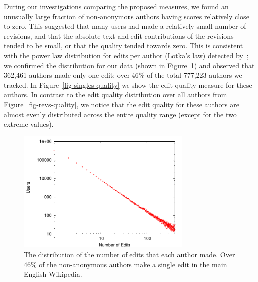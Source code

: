 During our investigations comparing the proposed measures,
we found an unusually large fraction of non-anonymous authors
having scores relatively close to zero.
This suggested that many users had made a relatively
small number of revisions, and that the absolute
text and edit contributions of the revisions tended to
be small, or that the quality tended towards zero.
This is consistent with the power law distribution
for edits per author (Lotka's law) detected by~\cite{Voss2005};
we confirmed the distribution for our data (shown
in Figure~\ref{fig-hist-numedits}) and observed
that 362,461 authors made only one edit:
over 46\% of the total 777,223 authors we tracked.
In Figure~\ref{fig-singles-quality} we show the edit quality
measure for these authors.
In contrast to the edit quality distribution over
all authors from Figure~\ref{fig-revs-quality},
we notice that the edit quality for these authors
are almost evenly distributed across the
entire quality range (except for the two extreme values).
%
\begin{figure}[tbhp]
    \begin{center}
    \includegraphics[width=0.75\textwidth]{part-I10-contrib/graphs/plot-hist-numedits}
    \end{center}
    \caption[Distribution of authors over number of edits]{
    	The distribution of the number of edits that each author made.
	Over 46\% of the non-anonymous authors
	make a single edit in the main English Wikipedia.
    }
    \label{fig-hist-numedits}
\end{figure}
%
